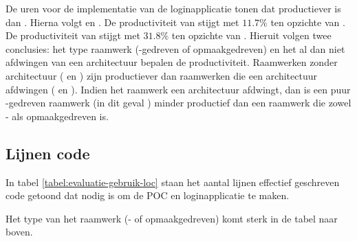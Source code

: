 De uren voor de implementatie van de loginapplicatie tonen dat \jqm{} productiever is dan \lungo{}. 
Hierna volgt \kendo{} en \st{}.
De productiviteit van \lungo{} stijgt met $11.7\%$ ten opzichte van \jqm{}.
De productiviteit van \kendo{} stijgt met $31.8\%$ ten opzichte van \st{}.
Hieruit volgen twee conclusies: het type raamwerk (\js-gedreven of opmaakgedreven) en het al dan niet afdwingen van een architectuur bepalen de productiviteit.
Raamwerken zonder architectuur (\jqm{} en \lungo{}) zijn productiever dan raamwerken die een architectuur afdwingen (\st{} en \kendo{}).
Indien het raamwerk een architectuur afdwingt, dan is een puur \js{}-gedreven raamwerk (in dit geval \st{}) minder productief dan een raamwerk die zowel \js{}- als opmaakgedreven is.

\subsection{Lijnen code}
In tabel \ref{tabel:evaluatie-gebruik-loc} staan het aantal lijnen effectief geschreven code getoond dat nodig is om de POC en loginapplicatie te maken.

Het type van het raamwerk (\js- of opmaakgedreven) komt sterk in de tabel naar boven.

\begin{table}
\centering
{}
\caption{Overzicht van het aantal lijnen effectief geschreven code.}
\label{tabel:evaluatie-gebruik-loc}
\end{table}

